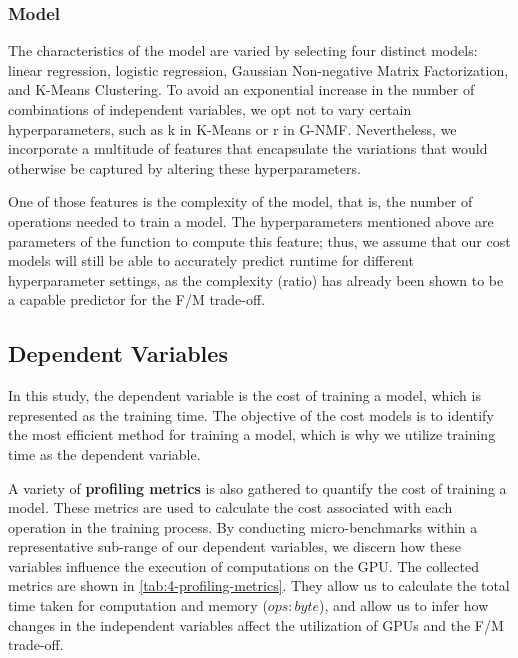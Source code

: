 \subsubsection{Model}
The characteristics of the model are varied by selecting four distinct models: linear regression, logistic regression, Gaussian Non-negative Matrix Factorization, and K-Means Clustering. To avoid an exponential increase in the number of combinations of independent variables, we opt not to vary certain hyperparameters, such as k in K-Means or r in G-NMF. Nevertheless, we incorporate a multitude of features that encapsulate the variations that would otherwise be captured by altering these hyperparameters.

One of those features is the complexity of the model, that is, the number of operations needed to train a model. The hyperparameters mentioned above are parameters of the function to compute this feature; thus, we assume that our cost models will still be able to accurately predict runtime for different hyperparameter settings, as the complexity (ratio) has already been shown to be a capable predictor for the F/M trade-off.

\subsection{Dependent Variables}
In this study, the dependent variable is the cost of training a model, which is represented as the training time. The objective of the cost models is to identify the most efficient method for training a model, which is why we utilize training time as the dependent variable.

A variety of \textbf{profiling metrics} is also gathered to quantify the cost of training a model. These metrics are used to calculate the cost associated with each operation in the training process. By conducting micro-benchmarks within a representative sub-range of our dependent variables, we discern how these variables influence the execution of computations on the GPU. The collected metrics are shown in \autoref{tab:4-profiling-metrics}. They allow us to calculate the total time taken for computation and memory ($ops:byte$), and allow us to infer how changes in the independent variables affect the utilization of GPUs and the F/M trade-off.


